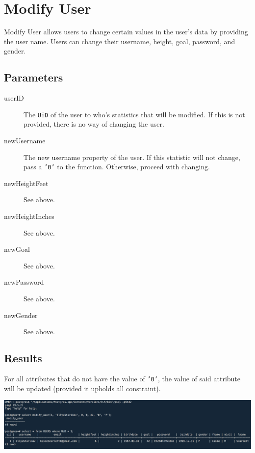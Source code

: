 \section{Modify User}
Modify User allows users to change certain values in the user's data by providing the user name. Users can change their username, height, goal, password, and gender.

\subsection*{Parameters}
\begin{description}
    \item [userID] The \texttt{UiD} of the user to who's statistics that will be modified. If this is not provided, there is no way of changing the user.
    \item [newUsername] The new username property of the user. If this statistic will not change, pass a \texttt{'0'} to the function. Otherwise, proceed with changing.
    \item [newHeightFeet] See above.
    \item [newHeightInches] See above.
    \item [newGoal] See above.
    \item [newPassword] See above.
    \item [newGender] See above.
\end{description}

\subsection*{Results}
For all attributes that do not have the value of \texttt{'0'}, the value of said attribute will be updated (provided it upholds all constraint).

\begin{center}
\includegraphics[width=\columnwidth]{include/assets/screenshots/modify_user}
\end{center}